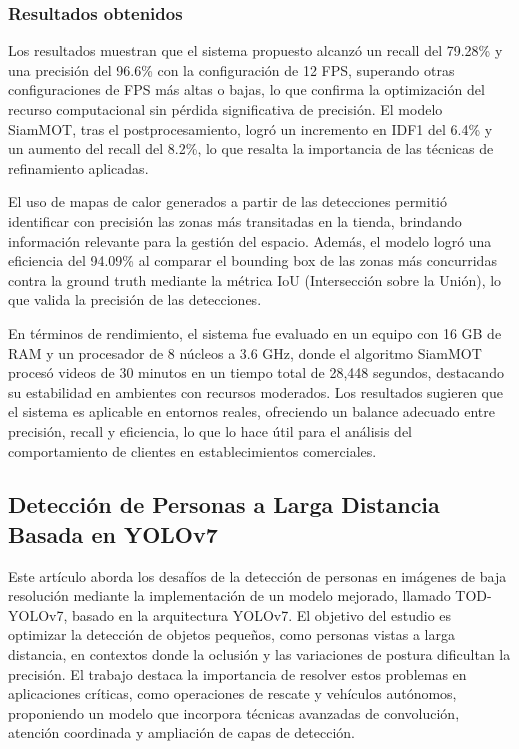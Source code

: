 \subsubsection{Resultados obtenidos}
Los resultados muestran que el sistema propuesto alcanzó un recall del 79.28\% y una precisión del 96.6\% con la configuración de 12 FPS, superando otras configuraciones de FPS más altas o bajas, lo que confirma la optimización del recurso computacional sin pérdida significativa de precisión. El modelo SiamMOT, tras el postprocesamiento, logró un incremento en IDF1 del 6.4\% y un aumento del recall del 8.2\%, lo que resalta la importancia de las técnicas de refinamiento aplicadas.

El uso de mapas de calor generados a partir de las detecciones permitió identificar con precisión las zonas más transitadas en la tienda, brindando información relevante para la gestión del espacio. Además, el modelo logró una eficiencia del 94.09\% al comparar el bounding box de las zonas más concurridas contra la ground truth mediante la métrica IoU (Intersección sobre la Unión), lo que valida la precisión de las detecciones.

En términos de rendimiento, el sistema fue evaluado en un equipo con 16 GB de RAM y un procesador de 8 núcleos a 3.6 GHz, donde el algoritmo SiamMOT procesó videos de 30 minutos en un tiempo total de 28,448 segundos, destacando su estabilidad en ambientes con recursos moderados. Los resultados sugieren que el sistema es aplicable en entornos reales, ofreciendo un balance adecuado entre precisión, recall y eficiencia, lo que lo hace útil para el análisis del comportamiento de clientes en establecimientos comerciales.

\subsection{Detección de Personas a Larga Distancia Basada en YOLOv7}

Este artículo aborda los desafíos de la detección de personas en imágenes de baja resolución mediante la implementación de un modelo mejorado, llamado TOD-YOLOv7, basado en la arquitectura YOLOv7. El objetivo del estudio es optimizar la detección de objetos pequeños, como personas vistas a larga distancia, en contextos donde la oclusión y las variaciones de postura dificultan la precisión. El trabajo destaca la importancia de resolver estos problemas en aplicaciones críticas, como operaciones de rescate y vehículos autónomos, proponiendo un modelo que incorpora técnicas avanzadas de convolución, atención coordinada y ampliación de capas de detección.



